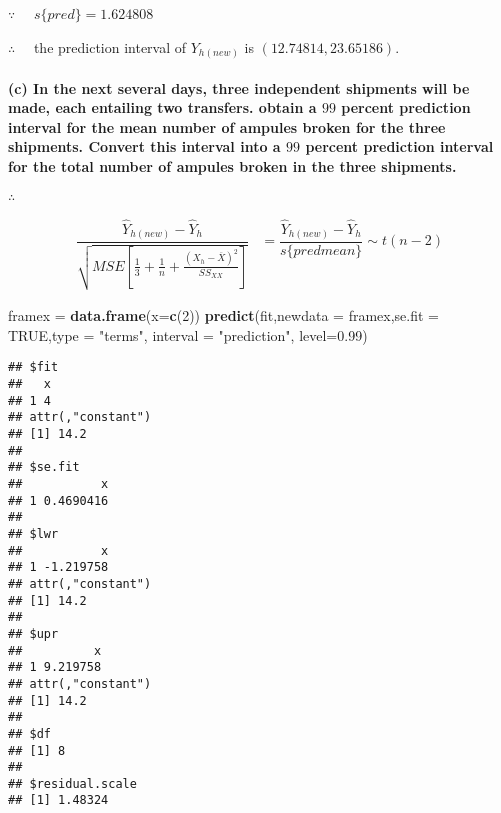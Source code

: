 \documentclass[]{article}
\newenvironment{Shaded}{\begin{snugshade}}{\end{snugshade}}
\newcommand{\KeywordTok}[1]{\textcolor[rgb]{0.13,0.29,0.53}{\textbf{#1}}}
\newcommand{\DataTypeTok}[1]{\textcolor[rgb]{0.13,0.29,0.53}{#1}}
\newcommand{\DecValTok}[1]{\textcolor[rgb]{0.00,0.00,0.81}{#1}}
\newcommand{\FloatTok}[1]{\textcolor[rgb]{0.00,0.00,0.81}{#1}}
\newcommand{\StringTok}[1]{\textcolor[rgb]{0.31,0.60,0.02}{#1}}
\newcommand{\OtherTok}[1]{\textcolor[rgb]{0.56,0.35,0.01}{#1}}
\newcommand{\NormalTok}[1]{#1}
\let\oldparagraph\paragraph
\renewcommand{\paragraph}[1]{\oldparagraph{#1}\mbox{}}
\begin{document}
\(\because\quad\) \(s\{pred\}=1.624808\)

\(\therefore\quad\) the prediction interval of \(Y_{h(new)}\) is
\((12.74814,23.65186)\).

\paragraph{\texorpdfstring{(c) In the next several days, three
independent shipments will be made, each entailing two transfers. obtain
a \(99\) percent prediction interval for the mean number of ampules
broken for the three shipments. Convert this interval into a \(99\)
percent prediction interval for the total number of ampules broken in
the three
shipments.}{(c) In the next several days, three independent shipments will be made, each entailing two transfers. obtain a 99 percent prediction interval for the mean number of ampules broken for the three shipments. Convert this interval into a 99 percent prediction interval for the total number of ampules broken in the three shipments.}}\label{c-in-the-next-several-days-three-independent-shipments-will-be-made-each-entailing-two-transfers.-obtain-a-99-percent-prediction-interval-for-the-mean-number-of-ampules-broken-for-the-three-shipments.-convert-this-interval-into-a-99-percent-prediction-interval-for-the-total-number-of-ampules-broken-in-the-three-shipments.}

\(\therefore\quad\)

\begin{align*}
\dfrac{\hat{Y}_{h(new)}-\hat{Y}_h}{\sqrt{MSE\left[\frac{1}{3}+\frac{1}{n}+\frac{(X_h-\overline{X})^2}{SS_{XX}}\right]}}&=\dfrac{\hat{Y}_{h(new)}-\hat{Y}_h}{s\{predmean\}}\sim t(n-2)
\end{align*}

\begin{Shaded}
\begin{Highlighting}[]
\NormalTok{framex =}\StringTok{ }\KeywordTok{data.frame}\NormalTok{(}\DataTypeTok{x=}\KeywordTok{c}\NormalTok{(}\DecValTok{2}\NormalTok{))}
\KeywordTok{predict}\NormalTok{(fit,}\DataTypeTok{newdata =}\NormalTok{ framex,}\DataTypeTok{se.fit =} \OtherTok{TRUE}\NormalTok{,}\DataTypeTok{type =} \StringTok{"terms"}\NormalTok{, }
\DataTypeTok{interval =} \StringTok{"prediction"}\NormalTok{, }\DataTypeTok{level=}\FloatTok{0.99}\NormalTok{)}
\end{Highlighting}
\end{Shaded}

\begin{verbatim}
## $fit
##   x
## 1 4
## attr(,"constant")
## [1] 14.2
## 
## $se.fit
##           x
## 1 0.4690416
## 
## $lwr
##           x
## 1 -1.219758
## attr(,"constant")
## [1] 14.2
## 
## $upr
##          x
## 1 9.219758
## attr(,"constant")
## [1] 14.2
## 
## $df
## [1] 8
## 
## $residual.scale
## [1] 1.48324
\end{verbatim}
\end{document}
